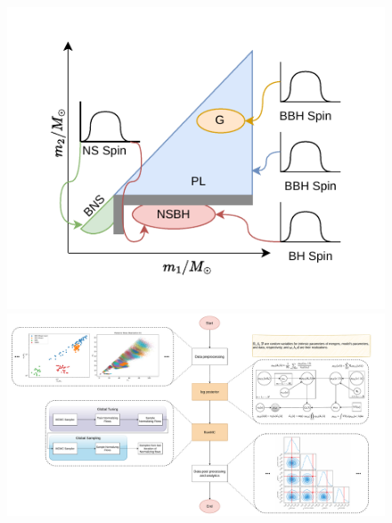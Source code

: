 \documentclass[a0,portrait]{a0poster}
\begin{document}
\begin{figure}[H]
    \centering
    \begin{minipage}{0.3\linewidth}
        \centering
        \includegraphics[width=\linewidth]{assets/plots/multisource.pdf}
    \end{minipage}%
    \hfill
    \begin{minipage}{0.5\linewidth}
        \centering
        \includegraphics[width=\linewidth]{assets/plots/post.pdf}
    \end{minipage}%
    \hfill
    \begin{minipage}{0.2\linewidth}

\end{minipage}
\end{figure}
\end{document}
